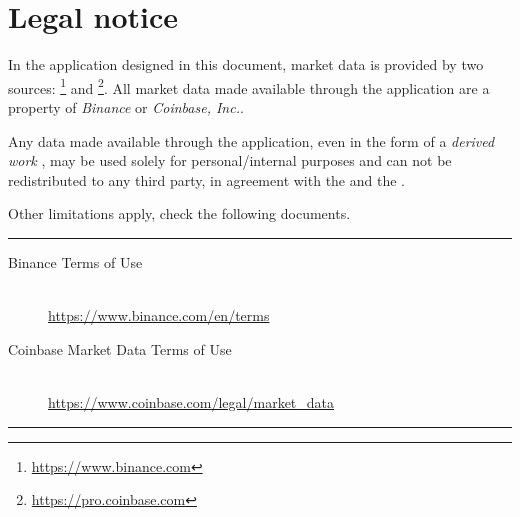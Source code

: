 \chapter{Legal notice}

In the application designed in this document, market data is provided by two
sources:
\footnote{\url{https://www.binance.com}}
and \footnote{\url{https://pro.coinbase.com}}. All market data made available
through the application are a property of \emph{Binance} or \emph{Coinbase,
Inc.}.

Any data made available through the application, even in the form of a
\emph{derived work} , may be used
solely for personal/internal purposes and can not be redistributed to any third
party, in agreement with the
 and the
.

Other limitations apply, check the following documents.

\vfill
\hrule
\large
\begin{description}
	\item[Binance Terms of Use]\hfill\\
		\url{https://www.binance.com/en/terms}
	\item[Coinbase Market Data Terms of Use]\hfill\\
		\url{https://www.coinbase.com/legal/market_data}
\end{description}
\normalsize
\hrule
\vfill
